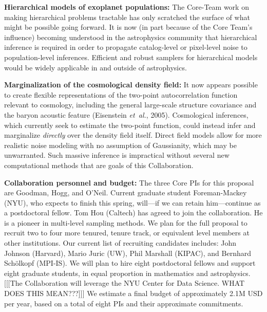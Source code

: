 \documentclass[11pt]{article}
\newcommand{\foreign}[1]{\textsl{#1}}
\newcommand{\etal}{\foreign{et~al.}}
\renewcommand{\paragraph}[1]{\smallskip\par\noindent\textbf{{#1}:}}
\begin{document}
\textbf{Hierarchical models of exoplanet populations:}
The Core-Team work on making hierarchical problems tractable has
only scratched the surface of what might be possible going forward.
It is now (in part because of the Core Team's influence) becoming
understood in the astrophysics community that hierarchical inference
is required in order to propagate catalog-level or pixel-level noise to
population-level inferences.
Efficient and robust samplers for hierarchical models would be widely 
applicable in
and outside of astrophysics.

\textbf{Marginalization of the cosmological density field:} 
It now appears possible to create flexible representations of the
two-point autocorrelation function relevant to cosmology, including
the general large-scale structure covariance and the baryon
acoustic feature (Eisenstein \etal, 2005).
Cosmological inferences, which currently seek to estimate the two-point 
function, could instead infer and marginalize {\em directly}
over the density field itself.
Direct field models allow for more realistic noise modeling with no
assumption of Gaussianity, which may be unwarranted.
Such massive inference is impractical without several new computational
methods
that are goals of this Collaboration.

\paragraph{Collaboration personnel and budget}
The three Core PIs for this proposal are Goodman, Hogg, and O'Neil.
Current graduate student Foreman-Mackey (NYU), who expects to finish
this spring, will---if we can retain him---continue as a postdoctoral
fellow.
Tom Hou (Caltech) has agreed to join the collaboration.
He is a pioneer in multi-level sampling methods.
We plan for the full proposal to recruit two to four more tenured,
tenure track, or equivalent level members at other institutions.  Our
current list of recruiting candidates includes: John
Johnson (Harvard), Mario Juric (UW), Phil Marshall (KIPAC), and Bernhard
Sch\"olkopf (MPI-IS).
We will plan to hire eight postdoctoral fellows and support eight
graduate students, in equal proportion in mathematics and astrophysics.
[[[The Collaboration will leverage the NYU Center for Data Science. WHAT
DOES THIS MEAN???]]]
We estimate a final budget of approximately 2.1M USD per year,
based on a total of eight PIs and their approximate commitments.
\end{document}
